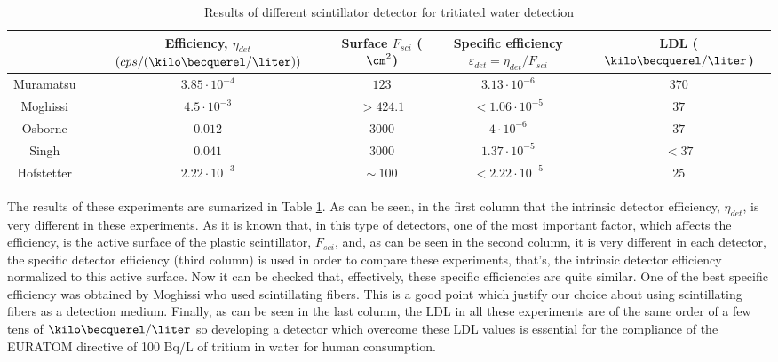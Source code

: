 \begin{table}[htbp]
\begin{center}
\begin{tabular}{|c|c|c|c|c|}
\hline
 & \parbox{6em}{\centering Efficiency, $\eta_{det}$\\ $(cps/(\kilo\becquerel/\liter))$}  & \parbox{5em}{\centering Surface\\ $F_{sci}$ ($\cm^2$)}  & \parbox{5em}{\centering Specific efficiency\\ $\varepsilon_{det}=\eta_{det}/F_{sci}$} & LDL ($\kilo\becquerel/\liter$)\\
\hline \hline \hline
Muramatsu & $3.85 \cdot 10^{-4}$ & $123$ & $3.13 \cdot 10^{-6}$ & $370$ \\ \hline
Moghissi & $4.5 \cdot 10^{-3}$ & $>424.1$ & $<1.06 \cdot 10^{-5}$ & $37$ \\ \hline
Osborne & $0.012$ & $3000$ & $4 \cdot 10^{-6}$ & $37$ \\ \hline
Singh & $0.041$ & $3000$ & $1.37 \cdot 10^{-5}$ & $<37$ \\ \hline
Hofstetter & $2.22 \cdot 10^{-3}$ & $\sim~100$ & $<2.22 \cdot 10^{-5}$ & $25$ \\ \hline
\end{tabular}
\caption{Results of different scintillator detector for tritiated water detection}
\label{tab:PlasticScinTritium}
\end{center}
\end{table}


The results of these experiments are sumarized in Table \ref{tab:PlasticScinTritium}. As can be seen, in the first column that the intrinsic detector efficiency, $\eta_{det}$, is very different in these experiments. As it is known that, in this type of detectors, one of the most important factor, which affects the efficiency, is the active surface of the plastic scintillator, $F_{sci}$, and, as can be seen in the second column, it is very different in each detector, the specific detector efficiency (third column) is used in order to compare these experiments, that's, the intrinsic detector efficiency normalized to this active surface. Now it can be checked that, effectively, these specific efficiencies are quite similar. One of the best specific efficiency was obtained by Moghissi who used scintillating fibers. This is a good point which justify our choice about using scintillating fibers as a detection medium. Finally, as can be seen in the last column, the LDL in all these experiments are of the same order of a few tens of $\kilo\becquerel/\liter$ so developing a detector which overcome these LDL values is essential for the compliance of the EURATOM directive of 100 Bq/L of tritium in water for human consumption.